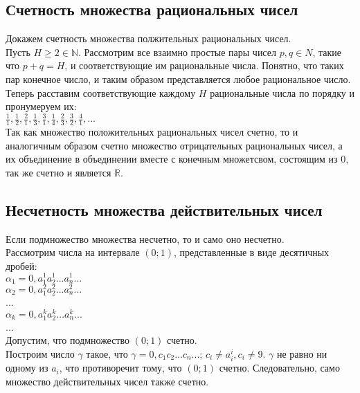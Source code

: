 \documentclass{article}
\begin{document}
        
    \subsection*{Счетность множества рациональных чисел}
        Докажем счетность множества полжительных рациональных чисел.
        \\ 
        Пусть $H \ge 2 \in \mathbb{N}$. Рассмотрим все взаимно простые пары чисел $p, q \in {N}$, такие что $p + q = H$, и соответствующие им рациональные числа.
        Понятно, что таких пар конечное число, и таким образом представляется любое рациональное число.
        \\
        Теперь расставим соответствующие каждому $H$ рациональные числа по порядку и пронумеруем их:
        \\
        $\frac{1}{1}, \frac{1}{2}, \frac{2}{1}, \frac{1}{3}, \frac{3}{1}, \frac{1}{4}, \frac{2}{3}, \frac{3}{2}, \frac{4}{1}, ...$
        \\
        Так как множество положительных рациональных чисел счетно, то и аналогичным образом счетно множество отрицательных рациональных чисел,
        а их объединение в объединении вместе с конечным множетсвом, состоящим из $0$, так же счетно и является $\mathbb{R}$.
        
    \subsection*{Несчетность множества действительных чисел}
        Если подмножество множества несчетно, то и само оно несчетно.
        \\
        Рассмотрим числа на интервале $(0;1)$, представленные в виде десятичных дробей:
        \\
        $\alpha_1 = 0,a_1^1a_2^1...a_n^1...$
        \\
        $\alpha_2 = 0,a_1^2a_2^2...a_n^2...$
        \\
        ...
        \\
        $\alpha_k = 0,a_1^ka_2^k...a_n^k...$
        \\
        ...
        \\
        Допустим, что подмножество $(0;1)$ счетно.
        \\
        Построим число $\gamma$ такое, что $\gamma = 0,c_1c_2...c_n...$; $c_i \neq a_i^i, c_i \neq 9$. $\gamma$ не равно ни одному из $a_i$,
        что противоречит тому, что $(0;1)$ счетно. Следовательно, само множество действительных чисел также счетно.
        
    \newpage

    \section{}
    \newpage
\end{document}
